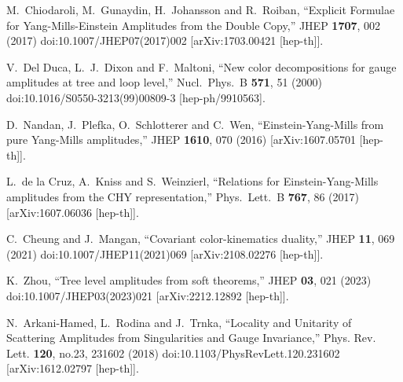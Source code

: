 \documentclass[preprint,showpacs,onecolumn,nofootinbib]{revtex4}
\begin{document}
\begin{thebibliography}{}
  M.~Chiodaroli, M.~Gunaydin, H.~Johansson and R.~Roiban,
  ``Explicit Formulae for Yang-Mills-Einstein Amplitudes from the Double Copy,''
  JHEP {\bf 1707}, 002 (2017)
  doi:10.1007/JHEP07(2017)002
  [arXiv:1703.00421 [hep-th]].

  V.~Del Duca, L.~J.~Dixon and F.~Maltoni,
  ``New color decompositions for gauge amplitudes at tree and loop level,''
  Nucl.\ Phys.\ B {\bf 571}, 51 (2000)
  doi:10.1016/S0550-3213(99)00809-3
  [hep-ph/9910563].


  D.~Nandan, J.~Plefka, O.~Schlotterer and C.~Wen,
  ``Einstein-Yang-Mills from pure Yang-Mills amplitudes,''
  JHEP {\bf 1610}, 070 (2016)
  [arXiv:1607.05701 [hep-th]].


  L.~de la Cruz, A.~Kniss and S.~Weinzierl,
  ``Relations for Einstein-Yang-Mills amplitudes from the CHY representation,''
  Phys.\ Lett.\ B {\bf 767}, 86 (2017)
  [arXiv:1607.06036 [hep-th]].


C.~Cheung and J.~Mangan,
``Covariant color-kinematics duality,''
JHEP \textbf{11}, 069 (2021)
doi:10.1007/JHEP11(2021)069
[arXiv:2108.02276 [hep-th]].



K.~Zhou,
``Tree level amplitudes from soft theorems,''
JHEP \textbf{03}, 021 (2023)
doi:10.1007/JHEP03(2023)021
[arXiv:2212.12892 [hep-th]].


N.~Arkani-Hamed, L.~Rodina and J.~Trnka,
``Locality and Unitarity of Scattering Amplitudes from Singularities and Gauge Invariance,''
Phys. Rev. Lett. \textbf{120}, no.23, 231602 (2018)
doi:10.1103/PhysRevLett.120.231602
[arXiv:1612.02797 [hep-th]].


\end{thebibliography}
\end{document}
